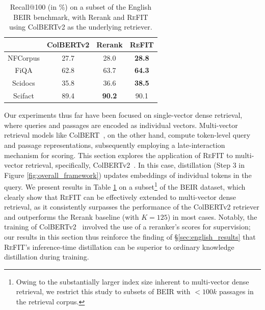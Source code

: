 \begin{table}
    \centering
    \scriptsize
    \setlength{\tabcolsep}{0.5em}
    \def\arraystretch{1.3}
    \vspace{-1em}
    \begin{tabular}{c|ccc}
    \hline
     & \multicolumn{1}{c}{\textbf{ColBERTv2}}& \multicolumn{1}{c}{\textbf{Rerank}} & \multicolumn{1}{c}{\textbf{\textsc{ReFIT}}}   \\
    \hline
       NFCorpus   &  27.7 & 28.0 & \textbf{28.8}\\
       FiQA  & 62.8 &  63.7 &  \textbf{64.3}\\
       Scidocs & 35.8 & 36.6&  \textbf{38.5}\\
       Scifact   &  89.4 & \textbf{90.2} & 90.1\\
    \hline
    \end{tabular}
    \vspace{-0.6em}
    \caption{Recall@100 (in \%) on a subset of the English BEIR benchmark, with Rerank and \textsc{ReFIT} using ColBERTv2 as the underlying retriever.}  
    \label{tab:multi_vector}
    \vspace{-1em}
\end{table}


Our experiments thus far have been focused on single-vector dense retrieval, where queries and passages are encoded as individual vectors.
Multi-vector retrieval models like ColBERT~\cite{khattab2020colbert, santhanam-etal-2022-colbertv2}, on the other hand, compute token-level query and passage representations, subsequently employing a late-interaction mechanism for scoring. This section explores the application of \textsc{ReFIT} to multi-vector retrieval, specifically, ColBERTv2~\cite{santhanam-etal-2022-colbertv2}.
In this case, distillation (Step 3 in Figure \ref{fig:overall_framework}) updates embeddings of individual tokens in the query. We present results in Table \ref{tab:multi_vector} on a subset\footnote{Owing to the substantially larger index size inherent to multi-vector dense retrieval, we restrict this study to subsets of BEIR with $<100k$ passages in the retrieval corpus.} of the BEIR dataset, which clearly show that \textsc{ReFIT} can be effectively extended to multi-vector dense retrieval, as it consistently surpasses the performance of the ColBERTv2 retriever and outperforms the Rerank baseline (with $K=125$) in most cases. Notably, the training of ColBERTv2~\cite{santhanam-etal-2022-colbertv2} involved the use of a reranker's scores for supervision; our results in this section thus reinforce the finding of \S{\ref{sec:english_results}} that \textsc{ReFIT}'s inference-time distillation can be superior to ordinary knowledge distillation during training.


